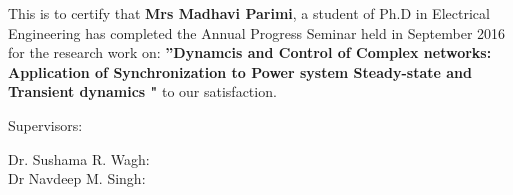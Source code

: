 \begin{spacing}{1.5}
\begin{certificate}

This is to certify that \textbf{Mrs Madhavi Parimi}, a student of Ph.D in Electrical Engineering has completed the Annual Progress Seminar held in September 2016 for the research work on:  \textbf{''Dynamcis and Control of Complex networks: Application of Synchronization to Power system Steady-state and Transient dynamics "} to our satisfaction.

\vspace{4cm}

Supervisors:

Dr. Sushama R. Wagh:  \\
Dr Navdeep M. Singh:\\
\vspace{3cm}


\newpage

\end{certificate}
\end{spacing}